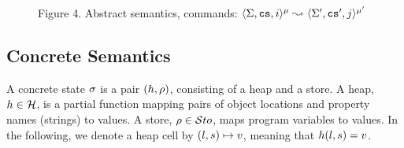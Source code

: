 \begin{figure}[t!]
{}
 \vspace*{-0.52cm}
 \captionsetup{format=nastyCaption}
\caption*{{\small Figure 4. Abstract semantics, commands: $\langle \Sigma, \mathtt{cs}, i \rangle^{\mu} \leadsto_{} \langle \Sigma', \mathtt{cs}', j \rangle^{\mu'}$}}\label{abs:sem:cmds:fig}
\vspace*{-0.65cm}
\end{figure}

\vspace*{-0.2cm}
\subsection{\jsil Concrete Semantics}
\label{subsec:concr}
A \jsil concrete state $\sigma$ is a pair $(h, \rho)$, consisting of a heap and a store. 
A heap, $h \in {\mathcal H}$, is a partial function mapping pairs of  object locations and property names (strings) to \jsil values.
A store, $\rho \in \mathcal{S}to$, maps program variables to \jsil values. 
In the following, we denote a heap cell by $(l, s) \mapsto v$, meaning that $h(l, s) = v$.

